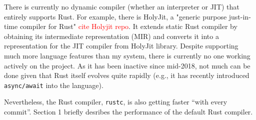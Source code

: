 There is currently no dynamic compiler
(whether an interpreter or JIT) that entirely supports
Rust. For example, there is 
HolyJit, a "generic purpose just-in-time compiler for Rust"
\textcolor{red}{cite Holyjit repo}. It extends static Rust compiler by
obtaining its intermediate representation (MIR) and converts it into a
representation for the JIT compiler from HolyJit library. Despite supporting
much more language features than my system, there is currently no one working
actively on the project.  As it has been inactive since mid-2018, not much can
be done given that Rust itself evolves quite rapidly (e.g., it has recently
introduced \texttt{async/await} into
the language).

Nevertheless, the Rust compiler, \texttt{rustc}, is also getting
faster ``with every commit''. Section 1 briefly desribes
the performance of the default Rust compiler.
